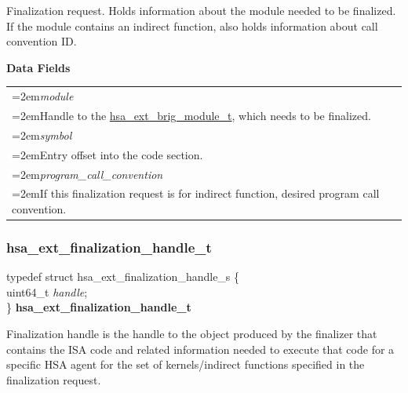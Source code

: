 \documentclass[final,oneside]{book}
\newcommand{\reffld}[1]{\textit{#1}}
\newenvironment{mylongtable}{\rowcolors{0}{lightgray}{lightgray}\longtable} {
\endlongtable}
\begin{document}
\vspace{-5mm}Finalization request. Holds information about the module needed to be finalized. If the module contains an indirect function, also holds information about call convention ID.

\noindent\textbf{Data Fields}\\[-6mm]
\begin{longtable}{@{}>{\hangindent=2em}p{\textwidth}}
\hypertarget{hsa_\-ext_\-finalization_\-request_\-t.module}{\reffld{module}}\\\hspace{2em}Handle to the \hyperlink{group__ext-finalizer_1ga104477d24306200a2847b44c325e312a}{hsa_\-ext_\-brig_\-module_\-t}, which needs to be finalized.\\[2mm]
\hypertarget{hsa_\-ext_\-finalization_\-request_\-t.symbol}{\reffld{symbol}}\\\hspace{2em}Entry offset into the code section.\\[2mm]
\hypertarget{hsa_\-ext_\-finalization_\-request_\-t.program_\-call_\-convention}{\reffld{program_\-call_\-convention}}\\\hspace{2em}If this finalization request is for indirect function, desired program call convention.
\end{longtable}



\subsubsection{hsa_\-ext_\-finalization_\-handle_\-t}
\vspace{-5.5mm}\begin{mylongtable}{@{}p{\textwidth}}
\rule{0pt}{3ex}typedef struct  hsa_ext_finalization_handle_s \{\\
\hspace{1.7em}uint64_\-t \reffld{handle};\\
\}  \hypertarget{group__ext-finalizer_1ga93de8cedb07abeabea546df3a621ec1a}{\textbf{hsa_\-ext_\-finalization_\-handle_\-t}}\rule[-2ex]{0pt}{0pt}
\end{mylongtable}

\vspace{-5mm}Finalization handle is the handle to the object produced by the finalizer that contains the ISA code and related information needed to execute that code for a specific HSA agent for the set of kernels/indirect functions specified in the finalization request.
\end{document}
